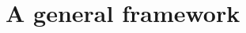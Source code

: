 \documentclass[11pt]{article} %
\begin{document}
 
 









\section{A general framework}\label{sec.framework}
\end{document}
